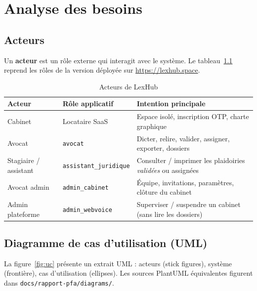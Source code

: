 \chapter{Analyse des besoins}
\label{ch:analyse}

\section{Acteurs}

Un \textbf{acteur} est un rôle externe qui interagit avec le système. Le tableau~\ref{tab:acteurs} reprend les rôles de la version déployée sur \url{https://lexhub.space}.

\begin{table}[H]
\centering
\caption{Acteurs de LexHub}
\label{tab:acteurs}
\begin{tabular}{@{}llp{7.2cm}@{}}
\toprule
\textbf{Acteur} & \textbf{Rôle applicatif} & \textbf{Intention principale} \\
\midrule
Cabinet & Locataire SaaS & Espace isolé, inscription OTP, charte graphique \\
Avocat & \texttt{avocat} & Dicter, relire, valider, assigner, exporter, dossiers \\
Stagiaire / assistant & \texttt{assistant\_juridique} & Consulter / imprimer les plaidoiries \emph{validées} ou assignées \\
Avocat admin & \texttt{admin\_cabinet} & Équipe, invitations, paramètres, clôture du cabinet \\
Admin plateforme & \texttt{admin\_webvoice} & Superviser / suspendre un cabinet (sans lire les dossiers) \\
\bottomrule
\end{tabular}
\end{table}

\section{Diagramme de cas d'utilisation (UML)}
\label{sec:uc}

La figure~\ref{fig:uc} présente un extrait UML : acteurs (stick figures), système (frontière), cas d'utilisation (ellipses). Les sources PlantUML équivalentes figurent dans \texttt{docs/rapport-pfa/diagrams/}.

